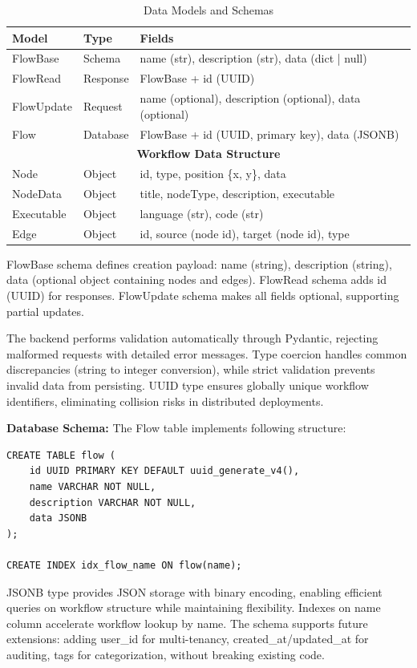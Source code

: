 \documentclass[12pt]{article}
\begin{document}
\begin{table}[h]
\centering
\caption{Data Models and Schemas}
\label{tab:data_models}
\begin{tabular}{|l|l|p{6cm}|}
\hline
\textbf{Model} & \textbf{Type} & \textbf{Fields} \\
\hline
FlowBase & Schema & name (str), description (str), data (dict | null) \\
FlowRead & Response & FlowBase + id (UUID) \\
FlowUpdate & Request & name (optional), description (optional), data (optional) \\
Flow & Database & FlowBase + id (UUID, primary key), data (JSONB) \\
\hline
\multicolumn{3}{|c|}{\textbf{Workflow Data Structure}} \\
\hline
Node & Object & id, type, position \{x, y\}, data \\
NodeData & Object & title, nodeType, description, executable \\
Executable & Object & language (str), code (str) \\
Edge & Object & id, source (node id), target (node id), type \\
\hline
\end{tabular}
\end{table}

FlowBase schema defines creation payload: name (string), description (string), data (optional object containing nodes and edges). FlowRead schema adds id (UUID) for responses. FlowUpdate schema makes all fields optional, supporting partial updates.

The backend performs validation automatically through Pydantic, rejecting malformed requests with detailed error messages. Type coercion handles common discrepancies (string to integer conversion), while strict validation prevents invalid data from persisting. UUID type ensures globally unique workflow identifiers, eliminating collision risks in distributed deployments.

\textbf{Database Schema:} The Flow table implements following structure:

\begin{verbatim}
CREATE TABLE flow (
    id UUID PRIMARY KEY DEFAULT uuid_generate_v4(),
    name VARCHAR NOT NULL,
    description VARCHAR NOT NULL,
    data JSONB
);

CREATE INDEX idx_flow_name ON flow(name);
\end{verbatim}

JSONB type provides JSON storage with binary encoding, enabling efficient queries on workflow structure while maintaining flexibility. Indexes on name column accelerate workflow lookup by name. The schema supports future extensions: adding user\_id for multi-tenancy, created\_at/updated\_at for auditing, tags for categorization, without breaking existing code.
\end{document}

